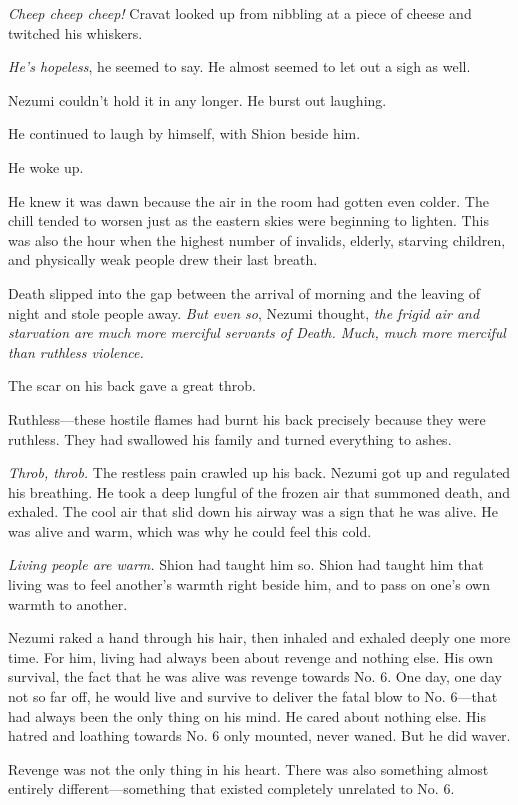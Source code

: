 \emph{Cheep cheep cheep!} Cravat looked up from nibbling at a piece of cheese
and twitched his whiskers.

\emph{He's hopeless}, he seemed to say. He almost seemed to let out a sigh as
well.

Nezumi couldn't hold it in any longer. He burst out laughing.

He continued to laugh by himself, with Shion beside him.

\mybreak

He woke up.

He knew it was dawn because the air in the room had gotten even colder.
The chill tended to worsen just as the eastern skies were beginning to
lighten. This was also the hour when the highest number of invalids,
elderly, starving children, and physically weak people drew their last
breath.

Death slipped into the gap between the arrival of morning and the
leaving of night and stole people away. \emph{But even so}, Nezumi thought, \emph{the
frigid air and starvation are much more merciful servants of Death.
Much, much more merciful than ruthless violence.}

The scar on his back gave a great throb.

Ruthless---these hostile flames had burnt his back precisely because they
were ruthless. They had swallowed his family and turned everything to
ashes.

\emph{Throb, throb.} The restless pain crawled up his back. Nezumi got up and
regulated his breathing. He took a deep lungful of the frozen air that
summoned death, and exhaled. The cool air that slid down his airway was
a sign that he was alive. He was alive and warm, which was why he could
feel this cold.

\emph{Living people are warm.} Shion had taught him so. Shion had taught him
that living was to feel another's warmth right beside him, and to pass
on one's own warmth to another.

Nezumi raked a hand through his hair, then inhaled and exhaled deeply
one more time. For him, living had always been about revenge and nothing
else. His own survival, the fact that he was alive was revenge towards
No. 6. One day, one day not so far off, he would live and survive to
deliver the fatal blow to No. 6---that had always been the only thing on
his mind. He cared about nothing else. His hatred and loathing towards
No. 6 only mounted, never waned. But he did waver.

Revenge was not the only thing in his heart. There was also something
almost entirely different---something that existed completely unrelated to
No. 6.

